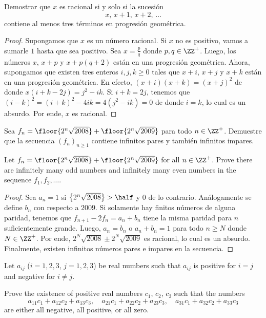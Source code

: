 
\begin{probEG}
  Demostrar que $x$ es racional si y solo si la sucesión
  \[x,\,x+1,\,x+2,\,\dots\]
  contiene al menos tres términos en progresión geométrica.
\end{probEG}

\begin{proof}
  Supongamos que $x$ es un número racional. Si $x$ no es positivo, vamos a
  sumarle $1$ hasta que sea positivo. Sea $x=\frac pq$ donde $p,q\in\ZZ^+$.
  Luego, los números $x$, $x+p$ y $x+p(q+2)$ están en una progresión geométrica.
  Ahora, supongamos que existen tres enteros $i,j,k\ge 0$ tales que $x+i$, $x+j$
  y $x+k$ están en una progresión geométrica. En efecto, $(x+i)(x+k)=(x+j)^2$ de
  donde $x(i+k-2j)=j^2-ik$. Si $i+k=2j$, tenemos que
  $(i-k)^2=(i+k)^2-4ik=4(j^2-ik)=0$ de donde $i=k$, lo cual es un absurdo. Por
  ende, $x$ es racional.
\end{proof}

\begin{probEG}[CGMO 2008/8]
  Sea $f_n=\floor{2^n\sqrt{2008}}+\floor{2^n\sqrt{2009}}$ para todo $n\in\ZZ^+$.
  Demuestre que la secuencia $(f_n)_{n\ge 1}$ contiene infinitos pares y también
  infinitos impares.
  \begin{hint}
    Let $f_n=\floor{2^n\sqrt{2008}}+\floor{2^n\sqrt{2009}}$ for all $n\in\ZZ^+$.
    Prove there are infinitely many odd numbers and infinitely many even numbers
    in the sequence $f_1,f_2,\dots$.
  \end{hint}
\end{probEG}

\begin{proof}
  Sea $a_n=1$ si $\left\{2^n\sqrt{2008}\right\}>\half$ y $0$ de lo contrario.
  Análogamente se define $b_n$ con respecto a $2009$. Si solamente hay finitos
  números de alguna paridad, tenemos que $f_{n+1}-2f_n=a_n+b_n$ tiene la misma
  paridad para $n$ suficientemente grande. Luego, $a_n=b_n$ o $a_n+b_n=1$ para
  todo $n\ge N$ donde $N\in\ZZ^+$. Por ende, $2^N\sqrt{2008}\pm2^N\sqrt{2009}$
  es racional, lo cual es un absurdo. Finalmente, existen infinitos números
  pares e impares en la secuencia.
\end{proof}


\begin{probEB}[ISL 2003/A1]
  Let $a_{ij}$ ($i=1,2,3$, $j=1,2,3$) be real numbers such that $a_{ij}$ is
  positive for $i=j$ and negative for $i\ne j$.

  Prove the existence of positive real numbers $c_{1}$, $c_{2}$, $c_{3}$ such
  that the numbers
  \[
    a_{11}c_{1}+a_{12}c_{2}+a_{13}c_{3},\quad
    a_{21}c_{1}+a_{22}c_{2}+a_{23}c_{3},\quad
    a_{31}c_{1}+a_{32}c_{2}+a_{33}c_{3}
  \]
  are either all negative, all positive, or all zero.
\end{probEB}

